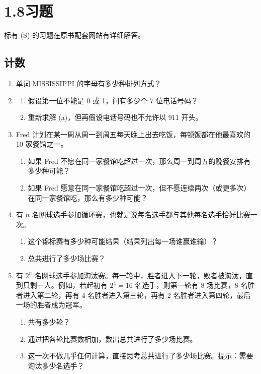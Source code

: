 \documentclass[UTF8, 12pt, fontset=fandol, oneside]{ctexart}
\begin{document}
\section*{1.8\quad 习题}

标有 (S) 的习题在原书配套网站有详细解答。

\subsection*{计数}

\begin{enumerate}
  \item 单词 MISSISSIPPI 的字母有多少种排列方式？

  \item
  \begin{enumerate}
    \item 假设第一位不能是 0 或 1，问有多少个 7 位电话号码？
    \item 重新求解 (a)，但再假设电话号码也不允许以 911 开头。
  \end{enumerate}

  \item Fred 计划在某一周从周一到周五每天晚上出去吃饭，每顿饭都在他最喜欢的 10 家餐馆之一。
  \begin{enumerate}
    \item 如果 Fred 不愿在同一家餐馆吃超过一次，那么周一到周五的晚餐安排有多少种可能？
    \item 如果 Fred 愿意在同一家餐馆吃超过一次，但不愿连续两次（或更多次）在同一家餐馆吃，那么有多少种可能？
  \end{enumerate}

  \item 有 $n$ 名网球选手参加循环赛，也就是说每名选手都与其他每名选手恰好比赛一次。
  \begin{enumerate}
    \item 这个锦标赛有多少种可能结果（结果列出每一场谁赢谁输）？
    \item 总共进行了多少场比赛？
  \end{enumerate}

  \item 有 $2^n$ 名网球选手参加淘汰赛。每一轮中，胜者进入下一轮，败者被淘汰，直到只剩一人。例如，若起初有 $2^4=16$ 名选手，则第一轮有 8 场比赛，8 名胜者进入第二轮，再有 4 名胜者进入第三轮，再有 2 名胜者进入第四轮，最后一场的胜者成为冠军。
  \begin{enumerate}
    \item 共有多少轮？
    \item 通过把各轮比赛数相加，数出总共进行了多少场比赛。
    \item 这一次不做几乎任何计算，直接思考总共进行了多少场比赛。提示：需要淘汰多少名选手？
  \end{enumerate}


\end{enumerate}
\end{document}
